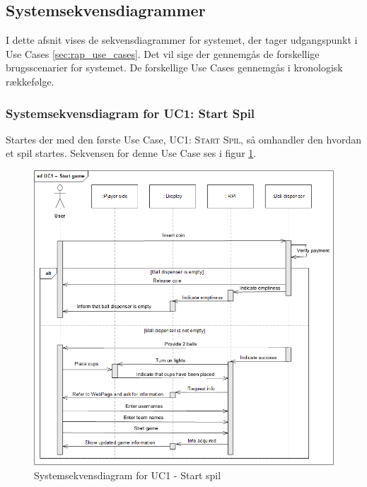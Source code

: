 \documentclass[Rapport/Rapport_main.tex]{subfiles}
\begin{document}
\subsection{Systemsekvensdiagrammer}
I dette afsnit vises de sekvensdiagrammer for systemet, der tager udgangspunkt i Use Cases \ref{sec:rap_use_cases}. Det vil sige der gennemgås de forskellige brugsscenarier for systemet. De forskellige Use Cases gennemgås i kronologisk rækkefølge.

\subsubsection{Systemsekvensdiagram for UC1: Start Spil}
Startes der med den første Use Case, \textsc{UC1: Start Spil}, så omhandler den hvordan et spil startes. Sekvensen for denne Use Case ses i figur \ref{fig:rap_sd_UC1}.
\begin{figure}
    \centering
    \includegraphics[scale=0.75]{Arkitektur/Sekvensdiagrammer/graphics/sd_UC1.png}
    \caption{Systemsekvensdiagram for UC1 - Start spil}
    \label{fig:rap_sd_UC1}
\end{figure}
\end{document}
